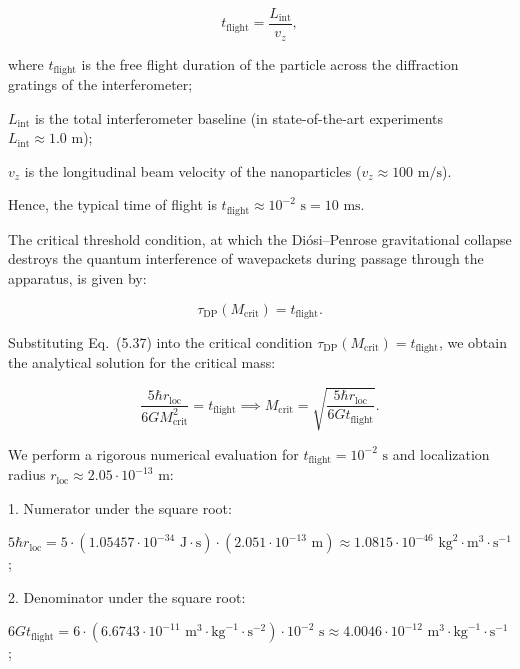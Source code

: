 \begin{equation}\label{eq:5.38}\tag{5.38}
t_{\text{flight}} = \frac{L_{\text{int}}}{v_z},
\end{equation}

where $t_{\text{flight}}$ is the free flight duration of the particle across the diffraction gratings of the interferometer;  

$L_{\text{int}}$ is the total interferometer baseline (in state-of-the-art experiments $L_{\text{int}} \approx 1.0\text{ m}$);  

$v_z$ is the longitudinal beam velocity of the nanoparticles ($v_z \approx 100\text{ m/s}$).

Hence, the typical time of flight is $t_{\text{flight}} \approx 10^{-2}\text{ s} = 10\text{ ms}$.

The critical threshold condition, at which the Diósi--Penrose gravitational collapse destroys the quantum interference of wavepackets during passage through the apparatus, is given by:

\begin{equation}\label{eq:5.39}\tag{5.39}
\tau_{\text{DP}}(M_{\text{crit}}) = t_{\text{flight}}.
\end{equation}

Substituting Eq.~(5.37) into the critical condition $\tau_{\text{DP}}(M_{\text{crit}}) = t_{\text{flight}}$, we obtain the analytical solution for the critical mass:

\begin{equation}\label{eq:5.42}\tag{5.42}
\frac{5 \hbar r_{\text{loc}}}{6 G M_{\text{crit}}^2} = t_{\text{flight}} \implies M_{\text{crit}} = \sqrt{\frac{5 \hbar r_{\text{loc}}}{6 G t_{\text{flight}}}}.
\end{equation}

We perform a rigorous numerical evaluation for $t_{\text{flight}} = 10^{-2}\text{ s}$ and localization radius $r_{\text{loc}} \approx 2.05 \cdot 10^{-13}\text{ m}$:

1. Numerator under the square root:

   $5 \hbar r_{\text{loc}} = 5 \cdot (1.05457 \cdot 10^{-34}\text{ J}\cdot\text{s}) \cdot (2.051 \cdot 10^{-13}\text{ m}) \approx 1.0815 \cdot 10^{-46}\text{ kg}^2\cdot\text{m}^3\cdot\text{s}^{-1}$;

2. Denominator under the square root:

   $6 G t_{\text{flight}} = 6 \cdot (6.6743 \cdot 10^{-11}\text{ m}^3\cdot\text{kg}^{-1}\cdot\text{s}^{-2}) \cdot 10^{-2}\text{ s} \approx 4.0046 \cdot 10^{-12}\text{ m}^3\cdot\text{kg}^{-1}\cdot\text{s}^{-1}$;

